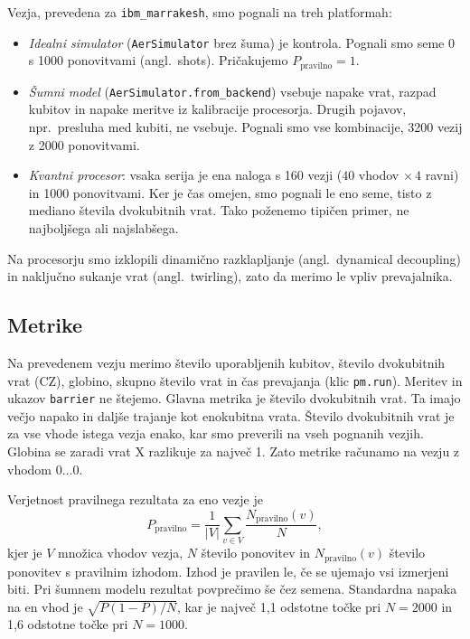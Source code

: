 Vezja, prevedena za \texttt{ibm\_marrakesh},
smo pognali na treh platformah:
\begin{itemize}
\item \emph{Idealni simulator} (\texttt{AerSimulator} brez šuma) je kontrola.
Pognali smo seme 0 s 1000 ponovitvami (angl.\ shots).
Pričakujemo $P_\text{pravilno} = 1$.
\item \emph{Šumni model} (\texttt{AerSimulator.from\_backend})
vsebuje napake vrat, razpad kubitov in napake meritve
iz kalibracije procesorja.
Drugih pojavov, npr.\ presluha med kubiti, ne vsebuje.
Pognali smo vse kombinacije,
3200 vezij z 2000 ponovitvami.
\item \emph{Kvantni procesor}: vsaka serija je ena naloga
s 160 vezji ($40$ vhodov $\times\,4$ ravni) in 1000 ponovitvami.
Ker je čas omejen, smo pognali le eno seme,
tisto z mediano števila dvokubitnih vrat.
Tako poženemo tipičen primer, ne najboljšega ali najslabšega.
\end{itemize}
Na procesorju smo izklopili dinamično razklapljanje
(angl.\ dynamical decoupling)
in naključno sukanje vrat (angl.\ twirling), zato
da merimo le vpliv prevajalnika.


\subsection{Metrike}
\label{g10:sec:metrike}

Na prevedenem vezju merimo število uporabljenih kubitov,
število dvokubitnih vrat (CZ), globino,
skupno število vrat in čas prevajanja (klic \texttt{pm.run}).
Meritev in ukazov \texttt{barrier} ne štejemo.
Glavna metrika je število dvokubitnih vrat.
Ta imajo večjo napako in daljše trajanje kot enokubitna vrata.
Število dvokubitnih vrat je za vse vhode istega vezja enako,
kar smo preverili na vseh pognanih vezjih.
Globina se zaradi vrat X razlikuje za največ 1.
Zato metrike računamo na vezju z vhodom $0\ldots0$.

Verjetnost pravilnega rezultata za eno vezje je
\begin{equation}
P_\text{pravilno} = \frac{1}{|V|} \sum_{v \in V} \frac{N_\text{pravilno}(v)}{N} ,
\label{g10:eq:ppravilno}
\end{equation}
kjer je $V$ množica vhodov vezja, $N$ število ponovitev
in $N_\text{pravilno}(v)$ število ponovitev s pravilnim izhodom.
Izhod je pravilen le, če se ujemajo vsi izmerjeni biti.
Pri šumnem modelu rezultat povprečimo še čez semena.
Standardna napaka na en vhod je $\sqrt{P(1-P)/N}$,
kar je največ 1,1 odstotne točke pri $N = 2000$
in 1,6 odstotne točke pri $N = 1000$.

